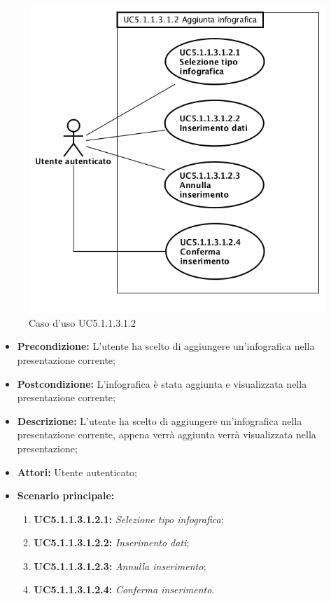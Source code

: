 \begin{figure}[h]
	\begin{center}
	\includegraphics[scale=0.4]{diagram/UC5-1-1-3-1-2.png}
	\caption{Caso d'uso UC5.1.1.3.1.2}
	\end{center}
\end{figure}
\begin{itemize}
	\item \textbf{Precondizione:} L'utente ha scelto di aggiungere un'infografica  nella presentazione corrente;
	\item \textbf{Postcondizione:} L'infografica è stata aggiunta e visualizzata nella presentazione corrente;
	\item \textbf{Descrizione:} L'utente ha scelto di aggiungere un'infografica nella presentazione corrente, appena verrà aggiunta verrà visualizzata nella presentazione;
	\item \textbf{Attori:} Utente autenticato;
	\item \textbf{Scenario principale:}
	\begin{enumerate}
		\item \textbf{ UC5.1.1.3.1.2.1:} \textit{ Selezione tipo infografica};
		\item \textbf{ UC5.1.1.3.1.2.2:} \textit{ Inserimento dati};
		\item \textbf{ UC5.1.1.3.1.2.3:} \textit{ Annulla inserimento};
		\item \textbf{ UC5.1.1.3.1.2.4:} \textit{ Conferma inserimento}.
	\end{enumerate}
\end{itemize}

